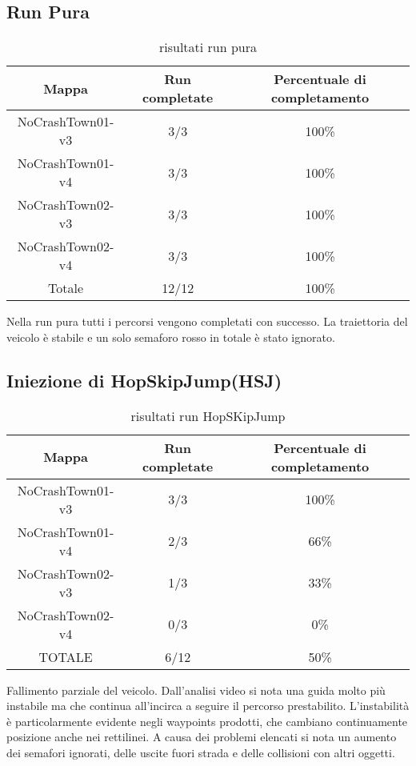 \subsection{Run Pura}
\begin{table}[h]
    \begin{tabular}{|c|c|c|}
        \hline
        Mappa                   & Run completate & Percentuale di completamento\\
        \hline
        NoCrashTown01-v3        & 3/3            & 100\% \\
        NoCrashTown01-v4        & 3/3            & 100\% \\
        NoCrashTown02-v3        & 3/3            & 100\% \\
        NoCrashTown02-v4        & 3/3            & 100\%  \\
        Totale                  & 12/12          & 100\% \\
        \hline
    \end{tabular}
    \caption{risultati run pura}
Nella run pura tutti i percorsi vengono completati con successo. La traiettoria del veicolo è stabile e un solo semaforo rosso in totale è stato ignorato.
\end{table}
\newpage
\subsection{Iniezione di HopSkipJump(HSJ)}
\begin{table}[h!]
    \begin{tabular}{|c|c|c|}
        \hline
        Mappa                   & Run completate & Percentuale di completamento\\
        \hline
        NoCrashTown01-v3        & 3/3            & 100\% \\
        NoCrashTown01-v4        & 2/3            & 66\% \\
        NoCrashTown02-v3        & 1/3            & 33\% \\
        NoCrashTown02-v4        & 0/3            & 0\%  \\
        TOTALE                  & 6/12           & 50\% \\
        \hline
    \end{tabular}
    \caption{risultati run  HopSKipJump}
    \label{tab:hsj}
\end{table}
 Fallimento parziale del veicolo. Dall'analisi video si nota una guida molto più instabile ma che continua all'incirca
a seguire il percorso prestabilito. L'instabilità è particolarmente evidente negli waypoints prodotti, che cambiano continuamente posizione anche nei rettilinei. A causa dei problemi elencati
si nota un aumento dei semafori ignorati, delle uscite fuori strada e delle collisioni con altri oggetti.

